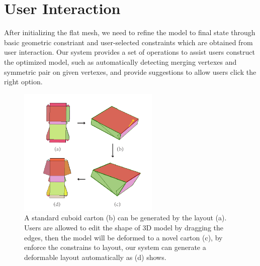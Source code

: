 \section{User Interaction}\label{sec:interaction}
After initializing the flat mesh, we need to refine the model to final state through basic geometric constriant and user-selected constraints which are obtained from user interaction. Our system provides a set of operations to assist users construct the optimized model, such as automatically detecting merging vertexes and symmetric pair on given vertexes, and provide suggestions to allow users click the right option.



{}

\begin{figure}
	\centering
	\includegraphics[width=0.6\textwidth]{images/editing}
	\caption{A standard cuboid carton (b) can be generated by the layout (a). Users are allowed to edit the shape of 3D model by dragging the edges, then the model will be deformed to a novel carton (c), by enforce the constrains to layout, our system can generate a deformable layout automatically as (d) shows.}
	\label{fig:editing}
\end{figure}